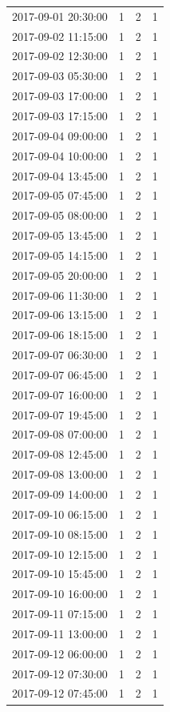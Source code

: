 \begin{tabular}{lrrr}
2017-09-01 20:30:00 & 1 & 2 & 1 \\
2017-09-02 11:15:00 & 1 & 2 & 1 \\
2017-09-02 12:30:00 & 1 & 2 & 1 \\
2017-09-03 05:30:00 & 1 & 2 & 1 \\
2017-09-03 17:00:00 & 1 & 2 & 1 \\
2017-09-03 17:15:00 & 1 & 2 & 1 \\
2017-09-04 09:00:00 & 1 & 2 & 1 \\
2017-09-04 10:00:00 & 1 & 2 & 1 \\
2017-09-04 13:45:00 & 1 & 2 & 1 \\
2017-09-05 07:45:00 & 1 & 2 & 1 \\
2017-09-05 08:00:00 & 1 & 2 & 1 \\
2017-09-05 13:45:00 & 1 & 2 & 1 \\
2017-09-05 14:15:00 & 1 & 2 & 1 \\
2017-09-05 20:00:00 & 1 & 2 & 1 \\
2017-09-06 11:30:00 & 1 & 2 & 1 \\
2017-09-06 13:15:00 & 1 & 2 & 1 \\
2017-09-06 18:15:00 & 1 & 2 & 1 \\
2017-09-07 06:30:00 & 1 & 2 & 1 \\
2017-09-07 06:45:00 & 1 & 2 & 1 \\
2017-09-07 16:00:00 & 1 & 2 & 1 \\
2017-09-07 19:45:00 & 1 & 2 & 1 \\
2017-09-08 07:00:00 & 1 & 2 & 1 \\
2017-09-08 12:45:00 & 1 & 2 & 1 \\
2017-09-08 13:00:00 & 1 & 2 & 1 \\
2017-09-09 14:00:00 & 1 & 2 & 1 \\
2017-09-10 06:15:00 & 1 & 2 & 1 \\
2017-09-10 08:15:00 & 1 & 2 & 1 \\
2017-09-10 12:15:00 & 1 & 2 & 1 \\
2017-09-10 15:45:00 & 1 & 2 & 1 \\
2017-09-10 16:00:00 & 1 & 2 & 1 \\
2017-09-11 07:15:00 & 1 & 2 & 1 \\
2017-09-11 13:00:00 & 1 & 2 & 1 \\
2017-09-12 06:00:00 & 1 & 2 & 1 \\
2017-09-12 07:30:00 & 1 & 2 & 1 \\
2017-09-12 07:45:00 & 1 & 2 & 1 \\

\end{tabular}
